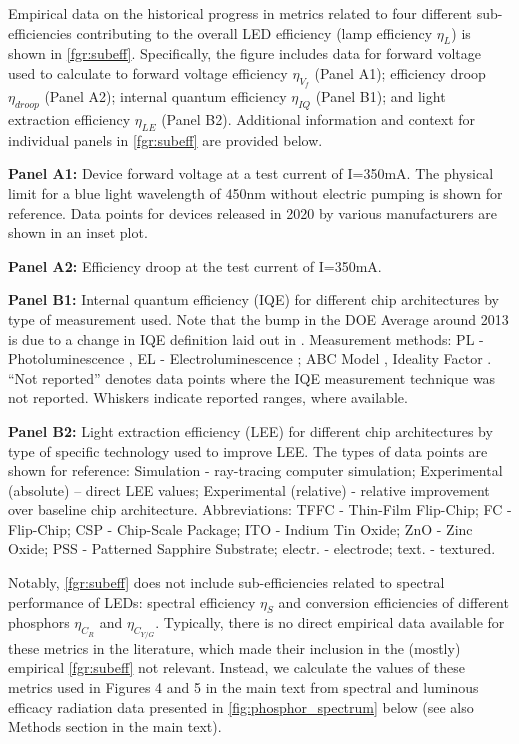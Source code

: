 \documentclass[parskip=full]{article}
\begin{document}
Empirical data on the historical progress in metrics related to four different sub-efficiencies contributing to the overall LED efficiency (lamp efficiency $\eta_L$) is shown in \cref{fgr:subeff}. Specifically, the figure includes data for forward voltage used to calculate to forward voltage efficiency $\eta_{V_f}$ (Panel A1); efficiency droop $\eta_{droop}$ (Panel A2); internal quantum efficiency $\eta_{IQ}$ (Panel B1); and light extraction efficiency $\eta_{LE}$ (Panel B2). Additional information and context for individual panels in \cref{fgr:subeff} are provided below.

\textbf{Panel A1:} Device forward voltage at a test current of I=350mA. The physical limit for a blue light wavelength of 450nm without electric pumping is shown for reference. Data points for devices released in 2020 by various manufacturers are shown in an inset plot. \

\textbf{Panel A2:} Efficiency droop at the test current of I=350mA. \

\textbf{Panel B1:} Internal quantum efficiency (IQE) for different chip architectures by type of measurement used. Note that the bump in the DOE Average around 2013 is due to a change in IQE definition laid out in \cite{doe_ssl_multiyear_2013}. Measurement methods: PL - Photoluminescence \cite{Shim_2018}, EL - Electroluminescence \cite{Getty_2009}; ABC Model \cite{Karpov_2014}, Ideality Factor \cite{Masui_2010}. “Not reported” denotes data points where the IQE measurement technique was not reported. Whiskers indicate reported ranges, where available. \

\textbf{Panel B2:} Light extraction efficiency (LEE) for different chip architectures by type of specific technology used to improve LEE. The types of data points are shown for reference: Simulation - ray-tracing computer simulation; Experimental (absolute) – direct LEE values; Experimental (relative) - relative improvement over baseline chip architecture. Abbreviations: TFFC - Thin-Film Flip-Chip; FC - Flip-Chip; CSP - Chip-Scale Package; ITO - Indium Tin Oxide; ZnO - Zinc Oxide; PSS - Patterned Sapphire Substrate; electr. - electrode; text. - textured.

Notably, \cref{fgr:subeff} does not include sub-efficiencies related to spectral performance of LEDs: spectral efficiency $\eta_S$ and conversion efficiencies of different phosphors $\eta_{C_R}$ and $\eta_{C_{Y/G}}$.  Typically, there is no direct empirical data available for these metrics in the literature, which made their inclusion in the (mostly) empirical \cref{fgr:subeff} not relevant. Instead, we calculate the values of these metrics used in Figures 4 and 5 in the main text from spectral and luminous efficacy radiation data presented in \cref{fig:phosphor_spectrum} below (see also Methods section in the main text).
\end{document}
